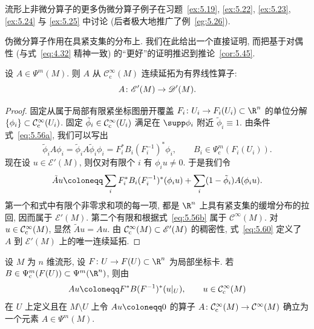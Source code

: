 流形上非微分算子的更多伪微分算子例子在习题~\ref{ex:5.19}, \ref{ex:5.22}, \ref{ex:5.23}, \ref{ex:5.24} 与 \ref{ex:5.25} 中讨论 (后者极大地推广了例~\ref{eg:5.26}).

伪微分算子作用在具紧支集的分布上. 我们在此给出一个直接证明, 而把基于对偶性 (与式~\eqref{eq:4.32} 精神一致) 的``更好''的证明推迟到推论~\ref{cor:5.45}.

\begin{proposition}[伪微分算子在紧支分布上的有界性]\label{prop:5.27}
设 $A \in \Psi^m(M)$. 则 $A$ 从 $\mathcal{C}_{\mathrm{c}}^\infty(M)$ 连续延拓为有界线性算子:
\begin{equation}\label{eq:5.58}
    A \colon \mathscr{E}'(M) \to \mathscr{D}'(M).
\end{equation}
\end{proposition}

\begin{proof}
固定从属于局部有限紧坐标图册开覆盖 $F_i \colon U_i \to F_i(U_i) \subset \R^n$ 的单位分解 $\{\phi_i\} \subset \mathcal{C}_{\mathrm{c}}^\infty(U_i)$. 固定 $\tilde{\phi}_i \in \mathcal{C}_{\mathrm{c}}^\infty(U_i)$ 满足在 $\supp \phi_i$ 附近 $\tilde{\phi}_i \equiv 1$. 由条件式~\eqref{eq:5.56a}, 我们可以写出
\begin{equation}\label{eq:5.59}
    \tilde{\phi}_i A \phi_i = \tilde{\phi}_i A \tilde{\phi}_i \phi_i = F_i^* B_i (F_i^{-1})^* \phi_i, \qquad B_i \in \Psi_{\mathrm{c}}^m(F_i(U_i)).
\end{equation}
现在设 $u \in \mathscr{E}'(M)$, 则仅对有限个 $i$ 有 $\phi_i u \neq 0$. 于是我们令
\begin{equation}\label{eq:5.60}
    \tilde{A} u \defeq \sum_i F_i^* B_i (F_i^{-1})^* (\phi_i u) + \sum_i (1 - \tilde{\phi}_i) A (\phi_i u).
\end{equation}
第一个和式中有限个非零求和项的每一项, 都是 $\R^n$ 上具有紧支集的缓增分布的拉回, 因而属于 $\mathscr{E}'(M)$. 第二个有限和根据式~\eqref{eq:5.56b} 属于 $\mathcal{C}^\infty(M)$. 对 $u \in \mathcal{C}_{\mathrm{c}}^\infty(M)$, 显然 $\tilde{A} u = A u$. 由 $\mathcal{C}_{\mathrm{c}}^\infty(M) \subset \mathscr{E}'(M)$ 的稠密性, 式~\eqref{eq:5.60} 定义了 $A$ 到 $\mathscr{E}'(M)$ 上的唯一连续延拓.
\end{proof}

\begin{lemma}[坐标卡内构造伪微分算子]\label{lem:5.28}
设 $M$ 为 $n$ 维流形, 设 $F \colon U \to F(U) \subset \R^n$ 为局部坐标卡. 若 $B \in \Psi_{\mathrm{c}}^m(F(U)) \subset \Psi^m(\R^n)$, 则由
\begin{equation}\label{eq:5.61}
    A u \defeq F^* B (F^{-1})^* (u|_U), \qquad u \in \SmoothComp(M)
\end{equation}
在 $U$ 上定义且在 $M \setminus U$ 上令 $A u \defeq 0$ 的算子 $A \colon \mathcal{C}_{\mathrm{c}}^\infty(M) \to \mathcal{C}^\infty(M)$ 确立为一个元素 $A \in \Psi^m(M)$.
\end{lemma}

